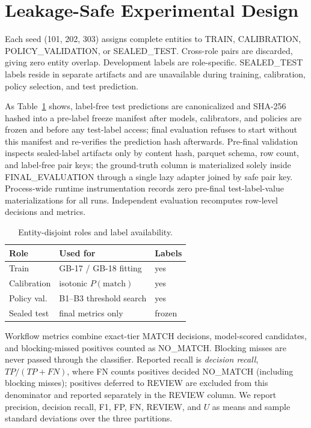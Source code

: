 \documentclass[conference]{IEEEtran}
\begin{document}
\section{Leakage-Safe Experimental Design}
Each seed (101, 202, 303) assigns complete entities to TRAIN, CALIBRATION, POLICY\_VALIDATION, or SEALED\_TEST. Cross-role pairs are discarded, giving zero entity overlap. Development labels are role-specific. SEALED\_TEST labels reside in separate artifacts and are unavailable during training, calibration, policy selection, and test prediction.

As Table~\ref{tab:roles} shows, label-free test predictions are canonicalized and SHA-256 hashed into a pre-label freeze manifest after models, calibrators, and policies are frozen and before any test-label access; final evaluation refuses to start without this manifest and re-verifies the prediction hash afterwards. Pre-final validation inspects sealed-label artifacts only by content hash, parquet schema, row count, and label-free pair keys; the ground-truth column is materialized solely inside FINAL\_EVALUATION through a single lazy adapter joined by safe pair key. Process-wide runtime instrumentation records zero pre-final test-label-value materializations for all runs. Independent evaluation recomputes row-level decisions and metrics.

\begin{table}[t]
\caption{Entity-disjoint roles and label availability.}
\label{tab:roles}
\centering
\setlength{\tabcolsep}{3pt}
\begin{tabular}{p{}p{}p{}}
\toprule
Role & Used for & Labels\\
\midrule
Train & GB-17 / GB-18 fitting & yes\\
Calibration & isotonic $P(\mathrm{match})$ & yes\\
Policy val. & B1--B3 threshold search & yes\\
Sealed test & final metrics only & frozen\\
\bottomrule
\end{tabular}
\end{table}

Workflow metrics combine exact-tier MATCH decisions, model-scored candidates, and blocking-missed positives counted as NO\_MATCH. Blocking misses are never passed through the classifier. Reported recall is \emph{decision recall}, $TP/(TP+FN)$, where FN counts positives decided NO\_MATCH (including blocking misses); positives deferred to REVIEW are excluded from this denominator and reported separately in the REVIEW column. We report precision, decision recall, F1, FP, FN, REVIEW, and $U$ as means and sample standard deviations over the three partitions.
\end{document}
